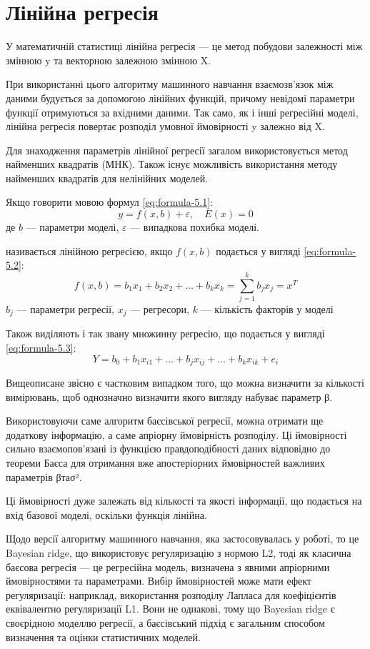 \section{Лінійна регресія}

У математичній статистиці лінійна регресія — це метод побудови залежності між змінною
y та векторною залежною змінною X.

При використанні цього алгоритму машинного навчання взаємозв'язок між даними будується
за допомогою лінійних функцій, причому невідомі параметри функції отримуються за
вхідними даними. Так само, як і інші регресійні моделі, лінійна регресія повертає
розподіл умовної ймовірності y залежно від X.

Для знаходження параметрів лінійної регресії загалом використовується метод
найменших квадратів (МНК). Також існує можливість використання методу найменших квадратів
для нелінійних моделей.

Якщо говорити мовою формул \eqref{eq:formula-5.1}:
\begin{equation}
	y = f(x, b) + \varepsilon, \quad E(x) = 0 \label{eq:formula-5.1}
\end{equation}
де $b$ --- параметри моделі, $\varepsilon$ --- випадкова похибка моделі.

називається лінійною регресією, якщо $f(x, b)$ подається у вигляді \eqref{eq:formula-5.2}:
\begin{equation}
	f(x, b) = b_{1} x_{1} + b_{2} x_{2} + \dots + b_{k} x_{k} = \sum_{j=1}^{k}b_{j}
	x_{j} = x^{T} \label{eq:formula-5.2}
\end{equation}
$b_{j}$ --- параметри регресії, $x_{j}$ --- регресори, $k$ --- кількість факторів
у моделі

Також виділяють і так звану множинну регресію, що подається у вигляді \eqref{eq:formula-5.3}:
\begin{equation}
	Y = b_{0} + b_{1} x_{i1}+ \dots + b_{j} x_{ij}+ \dots + b_{k} x_{ik}+ e_{i} \label{eq:formula-5.3}
\end{equation}

Вищеописане звісно є частковим випадком того, що можна визначити за кількості вимірювань,
щоб однозначно визначити якого вигляду набуває параметр β.

Використовуючи саме алгоритм баєсівської регресії, можна отримати ще додаткову
інформацію, а саме апріорну ймовірність розподілу. Ці ймовірності сильно взаємопов'язані
із функцією правдоподібності даних відповідно до теореми Баєса для отримання вже
апостеріорних ймовірностей важливих параметрів βтаσ².

Ці ймовірності дуже залежать від кількості та якості інформації, що подається на
вхід базової моделі, оскільки функція лінійна.

Щодо версії алгоритму машинного навчання, яка застосовувалась у роботі, то це Bayesian
ridge, що використовує регуляризацію з нормою L2, тоді як класична баєсова регресія
--- це регресійна модель, визначена з явними апріорними ймовірностями та
параметрами. Вибір ймовірностей може мати ефект регуляризації: наприклад, використання
розподілу Лапласа для коефіцієнтів еквівалентно регуляризації L1. Вони не
однакові, тому що Bayesian ridge є своєрідною моделлю регресії, а баєсівський
підхід є загальним способом визначення та оцінки статистичних моделей.
